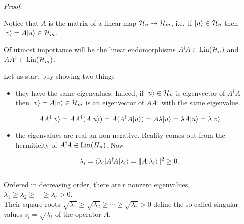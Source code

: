 \documentclass[11pt]{article}
\providecommand{\tightlist}{%
      \setlength{\itemsep}{0pt}\setlength{\parskip}{0pt}}
\begin{document}
    \emph{Proof}:

Notice that \(A\) is the matrix of a linear map \({\cal H}_n \to {\cal H}_m\),
i.e.~if \(|u\rangle\in {\cal H}_n\) then \(|v\rangle = A|u\rangle \in {\cal H}_m\).

Of utmost importance will be the linear endomorphisms
\(A^\dagger\! A\in \hbox{Lin}({\cal H}_n)\) and \(AA^\dagger \in \hbox{Lin}({\cal H}_m)\).

Let us start buy showing two things

\begin{itemize}
\tightlist
\item
  they have the same eigenvalues. Indeed, if \(|u\rangle\in {\cal H}_n\) is
  eigenvector of \(A^\dagger A\) then \(|v\rangle = A|v\rangle \in {\cal H}_m\)
  is an eigenvector of \(AA^\dagger\) with the same eigenvalue.
\end{itemize}

\[
AA^\dagger |v\rangle = AA^\dagger (A|u\rangle) = A (A^\dagger A|u\rangle) = A \lambda|u\rangle = \lambda A|u\rangle = \lambda |v\rangle
\]

    \begin{itemize}
\tightlist
\item
  the eigenvalues are real an non-negative. Reality comes out from the
  hermiticity of \(A^\dagger \! A\in \hbox{Lin}(H_n)\). Now
\end{itemize}

\[
\lambda_i = \langle \lambda_i|A^\dagger\! A|\lambda_i\rangle = \|A|\lambda_i\rangle\|^2 \ge 0.
\]\\
Ordered in decreasing order, there are \(r\) nonzero eigenvalues,
\(\lambda_1\ge\lambda_2\ge\cdots\ge\lambda_r>0\). \\
Their square roots
\(\sqrt{\lambda_1}\ge\sqrt{\lambda_2}\ge\cdots\ge\sqrt{\lambda_r}>0\)
define the so‐called singular values \(s_i = \sqrt{\lambda_i}\) of the
operator \(A\).
\end{document}
